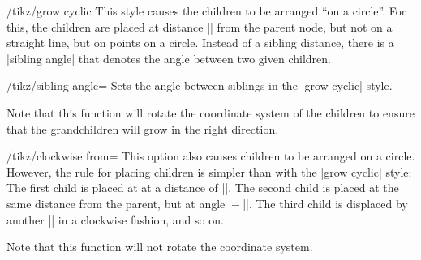 \begin{key}{/tikz/grow cyclic}
    This style causes the children to be arranged ``on a circle''. For this,
    the children are placed at distance |\tikzleveldistance| from the parent
    node, but not on a straight line, but on points on a circle. Instead of a
    sibling distance, there is a |sibling angle| that denotes the angle between
    two given children.
    \begin{key}{/tikz/sibling angle=}
        Sets the angle between siblings in the |grow cyclic| style.
    \end{key}
    Note that this function will rotate the coordinate system of the children
    to ensure that the grandchildren will grow in the right direction.
\begin{codeexample}[]
\end{codeexample}
\end{key}

\begin{key}{/tikz/clockwise from=}
    This option also causes children to be arranged on a circle. However, the
    rule for placing children is simpler than with the |grow cyclic| style: The
    first child is placed at  at a distance of
    |\tikzleveldistance|. The second child is placed at the same distance from
    the parent, but at angle ${}-{}$|\tikzsiblingangle|. The third
    child is displaced by another |\tikzsiblingangle| in a clockwise fashion,
    and so on.

    Note that this function will not rotate the coordinate system.
\begin{codeexample}[]
\end{codeexample}
\end{key}

